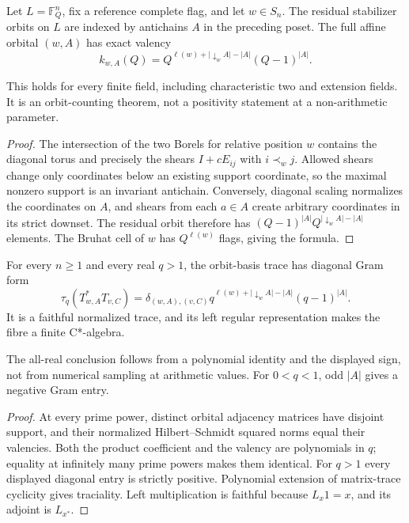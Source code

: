 \begin{theorem}
{\normalfont\statusProved}\quad
Let $L=\mathbb F_Q^n$, fix a reference complete flag, and let $w\in S_n$.
The residual stabilizer orbits on $L$ are indexed by antichains $A$ in the
preceding poset.  The full affine orbital $(w,A)$ has exact valency
\[
 k_{w,A}(Q)=Q^{\ell(w)+|\downarrow_wA|-|A|}(Q-1)^{|A|}.
\]
\end{theorem}
\begin{scope}
This holds for every finite field, including characteristic two and extension
fields.  It is an orbit-counting theorem, not a positivity statement at a
non-arithmetic parameter.
\end{scope}
\begin{proof}
The intersection of the two Borels for relative position $w$ contains the
diagonal torus and precisely the shears $I+cE_{ij}$ with $i\prec_wj$.
Allowed shears change only coordinates below an existing support coordinate,
so the maximal nonzero support is an invariant antichain.  Conversely,
diagonal scaling normalizes the coordinates on $A$, and shears from each
$a\in A$ create arbitrary coordinates in its strict downset.  The residual
orbit therefore has $(Q-1)^{|A|}Q^{|\downarrow_wA|-|A|}$ elements.  The
Bruhat cell of $w$ has $Q^{\ell(w)}$ flags, giving the formula.
\end{proof}

\begin{theorem}
{\normalfont\statusProved}\quad
For every $n\geq1$ and every real $q>1$, the orbit-basis trace has diagonal
Gram form
\[
 \tau_q(T_{w,A}^*T_{v,C})
 =\delta_{(w,A),(v,C)}
   q^{\ell(w)+|\downarrow_wA|-|A|}(q-1)^{|A|}.
\]
It is a faithful normalized trace, and its left regular representation makes
the fibre a finite C*-algebra.
\end{theorem}
\begin{scope}
The all-real conclusion follows from a polynomial identity and the displayed
sign, not from numerical sampling at arithmetic values.  For $0<q<1$, odd
$|A|$ gives a negative Gram entry.
\end{scope}
\begin{proof}
At every prime power, distinct orbital adjacency matrices have disjoint
support, and their normalized Hilbert--Schmidt squared norms equal their
valencies.  Both the product coefficient and the valency are polynomials in
$q$; equality at infinitely many prime powers makes them identical.  For
$q>1$ every displayed diagonal entry is strictly positive.  Polynomial
extension of matrix-trace cyclicity gives traciality.  Left multiplication is
faithful because $L_x1=x$, and its adjoint is $L_{x^*}$.
\end{proof}

